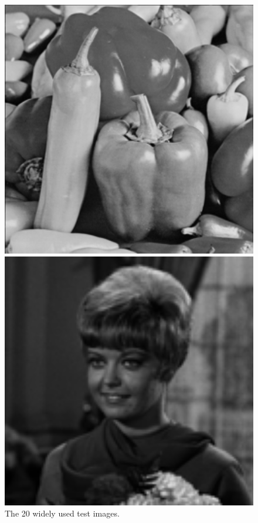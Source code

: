 \documentclass[runningheads]{llncs}
\begin{document}
\begin{figure}[t]
{\begin{minipage}{0.09\textwidth}
\end{minipage}
\begin{minipage}{0.09\textwidth}
\includegraphics[width=1.06\textwidth]{peppers.png}
\end{minipage}
\begin{minipage}{0.09\textwidth}
\includegraphics[width=1.06\textwidth]{zelda.png}
\end{minipage}
}\vspace{-0.1in}
\caption{The 20 widely used test images.}
\label{fig4}\vspace{-0.2in}
\end{figure}
\end{document}
